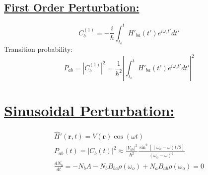 \subsection*{\underline{First Order Perturbation:}}
\begin{equation}
	C_b^{(1)} = -\frac{i}{\hbar}\int^t_{t_o}{H'_{ba}(t')e^{i\omega_ot'} dt'}
\end{equation}
Transition probability:
\begin{equation}
	P_{ab} = \left|C_b^{(1)}\right|^2 = \frac{1}{\hbar^2}\left|\int^t_{t_o}{H'_{ba}(t')e^{i\omega_ot'} dt'}\right|^2
\end{equation}

\section*{\underline{Sinusoidal Perturbation:}}
\begin{gather}
	\hat{H}'(\textbf{r},t) = V(\textbf{r})\cos{(\omega t)}\\
	P_{ab}(t) = |C_b(t)|^2 \approx \frac{|V_{ab}|^2}{\hbar^2}\frac{\sin^2{[(\omega_o - \omega)t/2]}}{(\omega_o-\omega)^2}\\
	\frac{dN_b}{dt} = -N_bA - N_bB_{ba}\rho(\omega_o) + N_aB_{ab}\rho(\omega_o) = 0
\end{gather}
